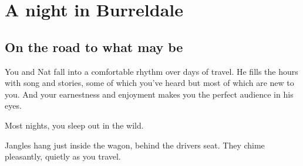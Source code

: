 \section{A night in Burreldale}


\begin{multicols}{2}
  \subsection{On the road to what may be}
  \begin{aloud}
    You and Nat fall into a comfortable rhythm over days of travel.
    He fills the hours with song and stories, some of which you've heard but most of which are new to you.
    And your earnestness and enjoyment makes you the perfect audience in his eyes.

    Most nights, you sleep out in the wild.

    Jangles hang just inside the wagon, behind the drivers seat.
    They chime pleasantly, quietly as you travel.
  \end{aloud}

  \vfill\null
  \columnbreak
{}

\end{multicols}
